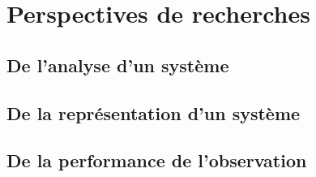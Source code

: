 \section{Perspectives de recherches}\label{sec:conclusion:perspectives}
\subsection{De l'analyse d'un système}
\subsection{De la représentation d'un système}
\subsection{De la performance de l'observation}